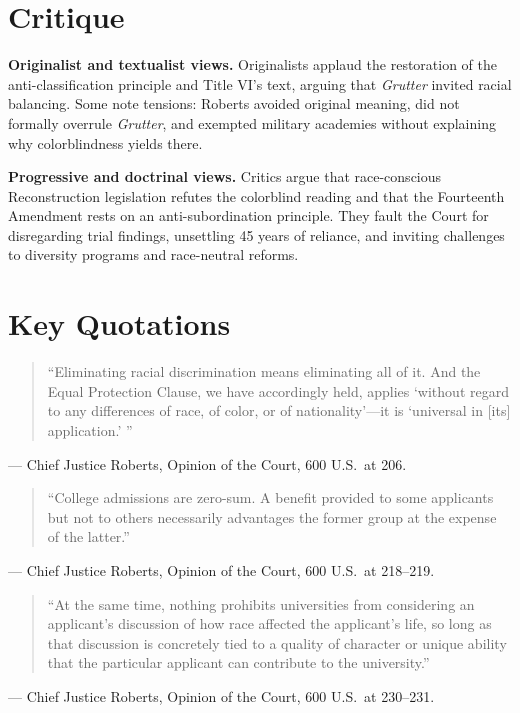 \documentclass[12pt]{article}
\begin{document}
\section{Critique}

\textbf{Originalist and textualist views.} Originalists applaud the restoration of the anti-classification principle and Title VI's text, arguing that \textit{Grutter} invited racial balancing. Some note tensions: Roberts avoided original meaning, did not formally overrule \textit{Grutter}, and exempted military academies without explaining why colorblindness yields there.

\textbf{Progressive and doctrinal views.} Critics argue that race-conscious Reconstruction legislation refutes the colorblind reading and that the Fourteenth Amendment rests on an anti-subordination principle. They fault the Court for disregarding trial findings, unsettling 45 years of reliance, and inviting challenges to diversity programs and race-neutral reforms.

\section{Key Quotations}

\begin{quote}
``Eliminating racial discrimination means eliminating all of it. And the Equal Protection Clause, we have accordingly held, applies `without regard to any differences of race, of color, or of nationality'---it is `universal in [its] application.' ''
\end{quote}
\noindent --- Chief Justice Roberts, Opinion of the Court, 600 U.S.\ at 206.

\begin{quote}
``College admissions are zero-sum. A benefit provided to some applicants but not to others necessarily advantages the former group at the expense of the latter.''
\end{quote}
\noindent --- Chief Justice Roberts, Opinion of the Court, 600 U.S.\ at 218--219.

\begin{quote}
``At the same time, nothing prohibits universities from considering an applicant's discussion of how race affected the applicant's life, so long as that discussion is concretely tied to a quality of character or unique ability that the particular applicant can contribute to the university.''
\end{quote}
\noindent --- Chief Justice Roberts, Opinion of the Court, 600 U.S.\ at 230--231.
\end{document}
